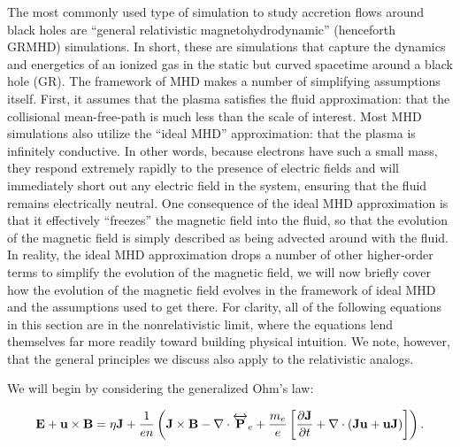 The most commonly used type of simulation to study accretion flows around black holes are ``general relativistic magnetohydrodynamic'' (henceforth GRMHD) simulations.  In short, these are simulations that capture the dynamics and energetics of an ionized gas in the static but curved spacetime around a black hole (GR).  The framework of MHD makes a number of simplifying assumptions itself.  First, it assumes that the plasma satisfies the fluid approximation: that the collisional mean-free-path is much less than the scale of interest.  Most MHD simulations also utilize the ``ideal MHD'' approximation: that the plasma is infinitely conductive.  In other words, because electrons have such a small mass, they respond extremely rapidly to the presence of electric fields and will immediately short out any electric field in the system, ensuring that the fluid remains electrically neutral.  One consequence of the ideal MHD approximation is that it effectively ``freezes'' the magnetic field into the fluid, so that the evolution of the magnetic field is simply described as being advected around with the fluid.  In reality, the ideal MHD approximation drops a number of other higher-order terms to simplify the evolution of the magnetic field, we will now briefly cover how the evolution of the magnetic field evolves in the framework of ideal MHD and the assumptions used to get there.  For clarity, all of the following equations in this section are in the nonrelativistic limit, where the equations lend themselves far more readily toward building physical intuition.  We note, however, that the general principles we discuss also apply to the relativistic analogs.

We will begin by considering the generalized Ohm's law:

\begin{equation}
	\bold{E}+\bold{u}\times \bold{B} = 
	\eta \bold{J} + \frac{1}{e n}\left(\bold{J} \times \bold{B} - \nabla \cdot \overleftrightarrow{\bold{P}}_{e} + \frac{m_e}{e}\left[\frac{\partial \bold{J}}{\partial t}+\nabla \cdot (\bold{Ju} + \bold{uJ})\right]\right).
	\label{ohm}
\end{equation}

